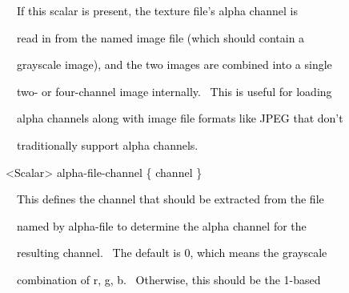 \documentclass[a4paper]{article}
\newcommand\textstyleOOoComputerKeyWord[1]{\textrm{\textcolor[rgb]{0.0,0.0,0.5019608}{#1}}}
\newcommand\textstyleOOoAssemblerSpecialChar[1]{\textrm{\textcolor[rgb]{0.0,0.5019608,0.0}{#1}}}
\newcommand\textstyleOOoAssemblerIdent[1]{\textrm{\textcolor{black}{#1}}}
\begin{document}
\bigskip

{\color{black}
\textstyleOOoComputerKeyWord{\textcolor{black}{\ \ \ \ If this scalar is present, the texture file's alpha channel is}}}

{\color{black}
\textstyleOOoComputerKeyWord{\textcolor{black}{\ \ \ \ read in from the named image file (which should contain a}}}

{\color{black}
\textstyleOOoComputerKeyWord{\textcolor{black}{\ \ \ \ grayscale image), and the two images are combined into a
single}}}

{\color{black}
\textstyleOOoComputerKeyWord{\textcolor{black}{\ \ \ \ two- or four-channel image internally. \ This is useful for
loading}}}

{\color{black}
\textstyleOOoComputerKeyWord{\textcolor{black}{\ \ \ \ alpha channels along with image file formats like JPEG that
don't}}}

{\color{black}
\textstyleOOoComputerKeyWord{\textcolor{black}{\ \ \ \ traditionally support alpha channels.}}}


\bigskip

{\color{black}
\textstyleOOoComputerKeyWord{\textcolor{black}{\ \ }}\textstyleOOoAssemblerSpecialChar{{\textless}}\textstyleOOoAssemblerIdent{Scalar}\textstyleOOoAssemblerSpecialChar{{\textgreater}}\textstyleOOoComputerKeyWord{\textcolor{black}{
}}\textstyleOOoAssemblerIdent{alpha}\textstyleOOoAssemblerSpecialChar{{}-}\textstyleOOoAssemblerIdent{file}\textstyleOOoAssemblerSpecialChar{{}-}\textstyleOOoAssemblerIdent{channel}\textstyleOOoComputerKeyWord{\textcolor{black}{
}}\textstyleOOoAssemblerSpecialChar{\{}\textstyleOOoComputerKeyWord{\textcolor{black}{
}}\textstyleOOoAssemblerIdent{channel}\textstyleOOoComputerKeyWord{\textcolor{black}{
}}\textstyleOOoAssemblerSpecialChar{\}}}


\bigskip

{\color{black}
\textstyleOOoComputerKeyWord{\textcolor{black}{\ \ \ \ This defines the channel that should be extracted from the
file}}}

{\color{black}
\textstyleOOoComputerKeyWord{\textcolor{black}{\ \ \ \ named by alpha-file to determine the alpha channel for the}}}

{\color{black}
\textstyleOOoComputerKeyWord{\textcolor{black}{\ \ \ \ resulting channel. \ The default is 0, which means the
grayscale}}}

{\color{black}
\textstyleOOoComputerKeyWord{\textcolor{black}{\ \ \ \ combination of r, g, b. \ Otherwise, this should be the
1-based}}}
\end{document}
